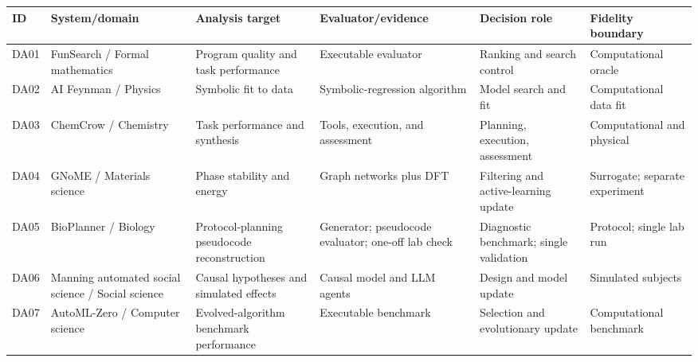 \begin{tabular}{llp{.18\linewidth}p{.18\linewidth}p{.18\linewidth}p{.16\linewidth}}
\toprule
ID & System/domain & Analysis target & Evaluator/evidence & Decision role & Fidelity boundary \\
\midrule
DA01 & FunSearch / Formal mathematics & Program quality and task performance & Executable evaluator & Ranking and search control & Computational oracle \\
DA02 & AI Feynman / Physics & Symbolic fit to data & Symbolic-regression algorithm & Model search and fit & Computational data fit \\
DA03 & ChemCrow / Chemistry & Task performance and synthesis & Tools, execution, and assessment & Planning, execution, assessment & Computational and physical \\
DA04 & GNoME / Materials science & Phase stability and energy & Graph networks plus DFT & Filtering and active-learning update & Surrogate; separate experiment \\
DA05 & BioPlanner / Biology & Protocol-planning pseudocode reconstruction & Generator; pseudocode evaluator; one-off lab check & Diagnostic benchmark; single validation & Protocol; single lab run \\
DA06 & Manning automated social science / Social science & Causal hypotheses and simulated effects & Causal model and LLM agents & Design and model update & Simulated subjects \\
DA07 & AutoML-Zero / Computer science & Evolved-algorithm benchmark performance & Executable benchmark & Selection and evolutionary update & Computational benchmark \\
\bottomrule
\end{tabular}
